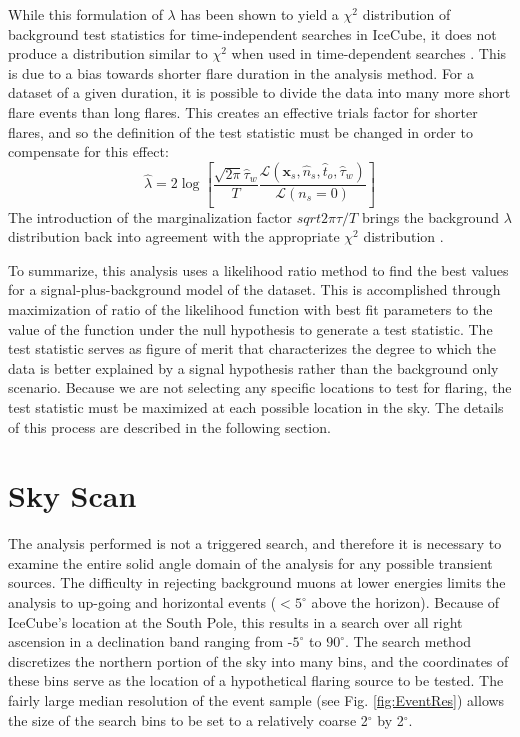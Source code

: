 \documentclass{gatech-thesis}
\begin{document}
While this formulation of $\lambda$ has been shown to yield a $\chi^2$ distribution of background test statistics for time-independent searches in IceCube, it does not produce a distribution similar to $\chi^2$ when used in time-dependent searches \cite{2012ApJ...744....1A}. This is due to a bias towards shorter flare duration in the analysis method. For a dataset of a given duration, it is possible to divide the data into many more short flare events than long flares. This creates an effective trials factor for shorter flares, and so the definition of the test statistic must be changed in order to compensate for this effect:
\begin{equation}
\hat{\lambda} = 2\log \left[\frac{\sqrt{2\pi}\hat{\tau}_w}{T}\frac{\mathcal{L}(\mathbf{x}_s,\hat{n}_s,\hat{t}_o,\hat{\tau}_w)}{\mathcal{L}(n_s = 0)} \right]
\end{equation}
The introduction of the marginalization factor $sqrt{2\pi}\tau /T$ brings the background $\lambda$ distribution back into agreement with the appropriate $\chi^2$ distribution \cite{2012ApJ...744....1A}.

To summarize, this analysis uses a likelihood ratio method to find the best values for a signal-plus-background model of the dataset. This is accomplished through maximization of ratio of the likelihood function with best fit parameters to the value of the function under the null hypothesis to generate a test statistic. The test statistic serves as figure of merit that characterizes the degree to which the data is better explained by a signal hypothesis rather than the background only scenario. Because we are not selecting any specific locations to test for flaring, the test statistic must be maximized at each possible location in the sky. The details of this process are described in the following section.
\section{Sky Scan}

The analysis performed is not a triggered search, and therefore it is necessary to examine the entire solid angle domain of the analysis for any possible transient sources. The difficulty in rejecting background muons at lower energies limits the analysis to up-going and horizontal events ($< 5^{\circ}$ above the horizon). Because of IceCube's location at the South Pole, this results in a search over all right ascension in a declination band ranging from -$5^{\circ}$ to $90^{\circ}$. The search method discretizes the northern portion of the sky into many bins, and the coordinates of these bins serve as the location of a hypothetical flaring source to be tested. The fairly large median resolution of the event sample (see Fig. \ref{fig:EventRes}) allows the size of the search bins to be set to a relatively coarse 2$^{\circ}$ by 2$^{\circ}$. 
\end{document}

